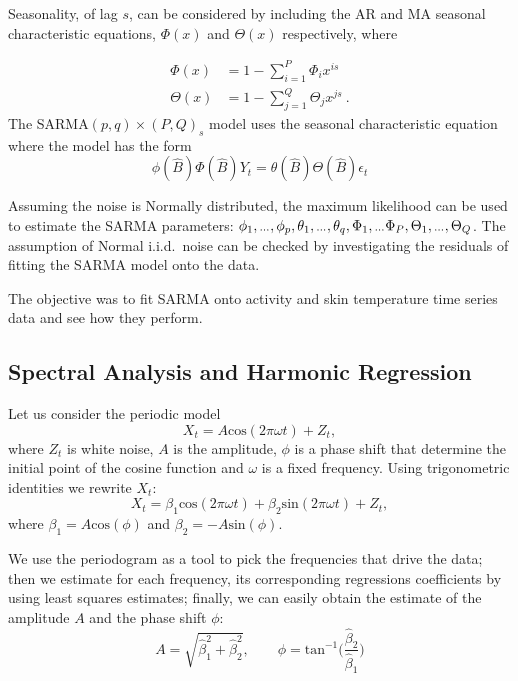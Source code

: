 \documentclass[]{article}
\newcommand{\dotdotdot}{\vphantom{.}_{\cdots}}
\newcommand{\backshift}{\widehat{B}}
\begin{document}
Seasonality, of lag $s$, can be considered by including the AR and MA seasonal characteristic equations, $\Phi(x)$ and $\Theta(x)$ respectively, where

\begin{align*}
\Phi(x) &= 1 - \sum_{i=1}^P \Phi_i x^{is} \\
\Theta(x) &= 1 - \sum_{j=1}^Q \Theta_j x^{js} \ .
\end{align*}
The SARMA$(p,q)\times(P,Q)_s$ model uses the seasonal characteristic equation where the model has the form
\begin{equation*}
\phi\left(\backshift\right)\Phi\left(\backshift\right)Y_t
=
\theta\left(\backshift\right)\Theta\left(\backshift\right)\epsilon_t
\end{equation*}

Assuming the noise is Normally distributed, the maximum likelihood can be used to estimate the SARMA parameters: $\phi_1,\dotdotdot,\phi_p,\theta_1,\dotdotdot,\theta_q,\Phi_1,\dotdotdot\Phi_P,\Theta_1,\dotdotdot,\Theta_Q$. The assumption of Normal i.i.d.~noise can be checked by investigating the residuals of fitting the SARMA model onto the data.

The objective was to fit SARMA onto activity and skin temperature time series data and see how they perform.

\subsection{Spectral Analysis and Harmonic Regression}

Let us consider the periodic model
\begin{equation*}
X_t = A\text{cos}(2\pi\omega t) + Z_t,
\end{equation*} 
where $Z_t$ is white noise, $A$ is the amplitude, $\phi$ is a phase shift that determine the initial point of the cosine function and $\omega$ is a fixed frequency. 
Using trigonometric identities we rewrite $X_t$:
\begin{equation*}
X_t = \beta_1\text{cos}(2\pi\omega t) + \beta_2\text{sin}(2\pi\omega t) + Z_t,
\end{equation*}
where $\beta_1 = A\text{cos}(\phi)$ and $\beta_2 = -A\text{sin}(\phi)$.

We use the periodogram as a tool to pick the frequencies that drive the data; then we estimate for each frequency, its corresponding regressions coefficients by using least squares estimates; finally, we can easily obtain the estimate of the amplitude $ A$ and the phase shift $\phi$:
\begin{equation*}
A = \sqrt{\hat{\beta}_1^2 + \hat{\beta}_2^2}, \qquad \phi = \text{tan}^{-1}\Big(\frac{\hat{\beta}_2}{\hat{\beta}_1}\Big)
\end{equation*}
\end{document}
